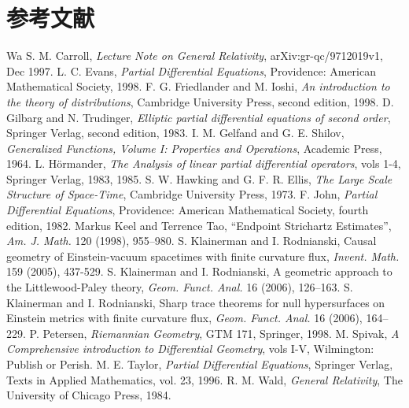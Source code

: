\section*{参考文献}
\begin{mybibliography}{Wa}
 S. M. Carroll, \emph{Lecture Note on General Relativity}, arXiv:gr-qc/9712019v1, Dec 1997.
 L. C. Evans, \emph{Partial Differential Equations}, Providence: American Mathematical Society, 1998.
 F. G. Friedlander and M. Ioshi, \emph{An introduction to the theory of distributions}, Cambridge University Press, second edition, 1998.
 D. Gilbarg and N. Trudinger, \emph{Elliptic partial differential equations of second order}, Springer Verlag, second edition, 1983.
 I. M. Gelfand and G. E. Shilov, \emph{Generalized Functions, Volume I: Properties and Operations}, Academic Press, 1964.
 L. Hörmander, \emph{The Analysis of linear partial differential operators}, vols 1-4, Springer Verlag, 1983, 1985.
 S. W. Hawking and G. F. R. Ellis, \emph{The Large Scale Structure of Space-Time}, Cambridge University Press, 1973.
 F. John, \emph{Partial Differential Equations}, Providence: American Mathematical Society, fourth edition, 1982.
 Markus Keel and Terrence Tao, ``Endpoint Strichartz Estimates'', \emph{Am. J. Math.} 120 (1998), 955--980.
 S. Klainerman and I. Rodnianski, Causal geometry of Einstein-vacuum spacetimes with finite curvature flux, \emph{Invent. Math.} 159 (2005), 437-529.
 S. Klainerman and I. Rodnianski, A geometric approach to the Littlewood-Paley theory, \emph{Geom. Funct. Anal.} 16 (2006), 126--163.
 S. Klainerman and I. Rodnianski, Sharp trace theorems for null hypersurfaces on Einstein metrics with finite curvature flux, \emph{Geom. Funct. Anal.} 16 (2006), 164--229.
 P. Petersen, \emph{Riemannian Geometry}, GTM 171, Springer, 1998.
 M. Spivak, \emph{A Comprehensive introduction to Differential Geometry}, vols I-V, Wilmington: Publish or Perish.
 M. E. Taylor, \emph{Partial Differential Equations}, Springer Verlag, Texts in Applied Mathematics, vol. 23, 1996.
 R. M. Wald, \emph{General Relativity}, The University of Chicago Press, 1984.
\end{mybibliography}
